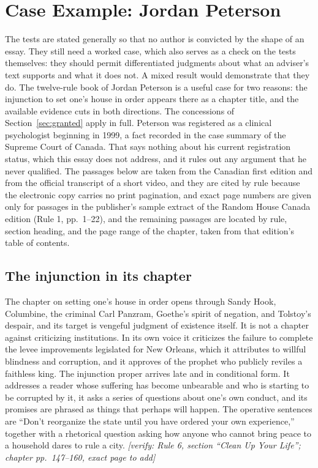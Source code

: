 \documentclass[12pt]{article}
\newif\ifverify\verifytrue
\newcommand{\passage}[1]{\ifverify{\footnotesize\color{gray}\textit{[verify: #1]}}\fi}
\begin{document}
\section{Case Example: Jordan Peterson}\label{sec:case}

The tests are stated generally so that no author is convicted by the shape of an essay. They still need a worked case, which also serves as a check on the tests themselves: they should permit differentiated judgments about what an adviser's text supports and what it does not. A mixed result would demonstrate that they do. The twelve-rule book of Jordan Peterson \cite{peterson2018} is a useful case for two reasons: the injunction to set one's house in order appears there as a chapter title, and the available evidence cuts in both directions. The concessions of Section~\ref{sec:granted} apply in full. Peterson was registered as a clinical psychologist beginning in 1999, a fact recorded in the case summary of the Supreme Court of Canada. That says nothing about his current registration status, which this essay does not address, and it rules out any argument that he never qualified. The passages below are taken from the Canadian first edition and from the official transcript of a short video, and they are cited by rule because the electronic copy carries no print pagination, and exact page numbers are given only for passages in the publisher's sample extract of the Random House Canada edition (Rule 1, pp.~1--22), and the remaining passages are located by rule, section heading, and the page range of the chapter, taken from that edition's table of contents.

\subsection*{The injunction in its chapter}

The chapter on setting one's house in order opens through Sandy Hook, Columbine, the criminal Carl Panzram, Goethe's spirit of negation, and Tolstoy's despair, and its target is vengeful judgment of existence itself. It is not a chapter against criticizing institutions. In its own voice it criticizes the failure to complete the levee improvements legislated for New Orleans, which it attributes to willful blindness and corruption, and it approves of the prophet who publicly reviles a faithless king. The injunction proper arrives late and in conditional form. It addresses a reader whose suffering has become unbearable and who is starting to be corrupted by it, it asks a series of questions about one's own conduct, and its promises are phrased as things that perhaps will happen. The operative sentences are ``Don't reorganize the state until you have ordered your own experience,'' together with a rhetorical question asking how anyone who cannot bring peace to a household dares to rule a city. \passage{Rule 6, section ``Clean Up Your Life''; chapter pp.~147--160, exact page to add}
\end{document}
